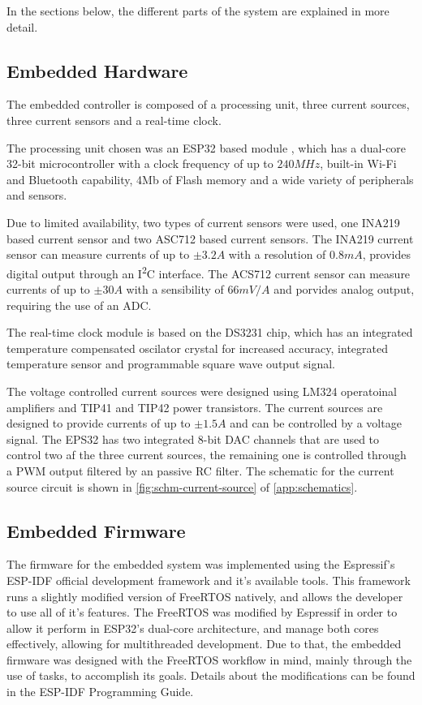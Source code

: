 \documentclass[10pt,twocolumn,letterpaper]{article}
\begin{document}
In the sections below, the different parts of the system are explained in more detail.

\subsection{Embedded Hardware}

The embedded controller is composed of a processing unit, three current sources, three current sensors and a real-time clock.

The processing unit chosen was an ESP32 based module \cite{esp32}, which has a dual-core 32-bit microcontroller with a clock frequency of up to $240 MHz$, built-in Wi-Fi and Bluetooth capability, 4Mb of Flash memory and a wide variety of  peripherals and sensors.

Due to limited availability, two types of current sensors were used, one INA219\cite{ina219} based current sensor and two ASC712 \cite{acs712} based current sensors.
The INA219 current sensor can measure currents of up to $\pm 3.2 A$ with a resolution of $0.8 mA$, provides digital output through an I\textsuperscript{2}C interface.
The ACS712 current sensor can measure currents of up to $\pm 30 A$ with a sensibility of $66 mV/A$ and porvides analog output, requiring the use of an ADC.

The real-time clock module is based on the DS3231 \cite{ds3231} chip, which has an integrated temperature compensated oscilator crystal for increased accuracy, integrated temperature sensor and programmable square wave output signal.

The voltage controlled current sources were designed using LM324 \cite{lm324n} operatoinal amplifiers and TIP41 and TIP42 \cite{tip4x} power transistors.
The current sources are designed to provide currents of up to $\pm 1.5 A$ and can be controlled by a voltage signal.
The EPS32 has two integrated 8-bit DAC channels that are used to control two af the three current sources, the remaining one is controlled through a PWM output filtered by an passive RC filter.
The schematic for the current source circuit is shown in \autoref{fig:schm-current-source} of \autoref{app:schematics}.

\subsection{Embedded Firmware}

The firmware for the embedded system was implemented using the Espressif's ESP-IDF\cite{espidf} official development framework and it's available tools.
This framework runs a slightly modified version of FreeRTOS\cite{freertos} natively, and allows the developer to use all of it's features.
The FreeRTOS was modified by Espressif in order to allow it perform in ESP32's dual-core architecture, and manage both cores effectively, allowing for multithreaded development.
Due to that, the embedded firmware was designed with the FreeRTOS workflow in mind, mainly through the use of tasks, to accomplish its goals.
Details about the modifications can be found in the ESP-IDF Programming Guide\cite{espidf}.
\end{document}
